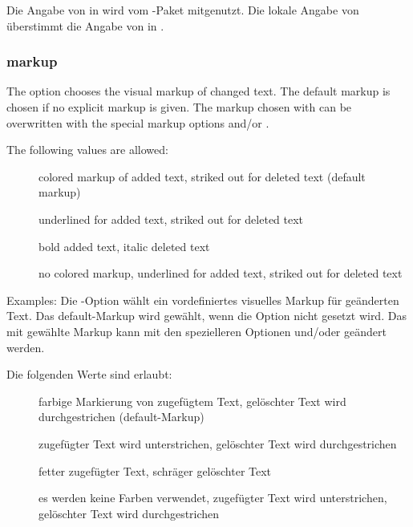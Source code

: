 		Die Angabe von  in  wird vom -Paket mitgenutzt.
		Die lokale Angabe von  überstimmt die Angabe von  in .
	\fi


\subsubsection{markup}
\ifENGLISH
	The  option chooses the visual markup of changed text.
	The default markup is chosen if no explicit markup is given.
	The markup chosen with  can be overwritten with the special markup options  and/or .

	The following values are allowed:
	\begin{description}
		\item [] colored markup of added text, striked out for deleted text (default markup)
		\item [] underlined for added text, striked out for deleted text
		\item [] bold added text, italic deleted text
		\item [] no colored markup, underlined for added text, striked out for deleted text
	\end{description}

	Examples:
\fi
	\ifGERMAN
		Die -Option wählt ein vordefiniertes visuelles Markup für geänderten Text.
		Das default-Markup wird gewählt, wenn die Option nicht gesetzt wird.
		Das mit  gewählte Markup kann mit den spezielleren Optionen  und/oder  geändert werden.

		Die folgenden Werte sind erlaubt:
		\begin{description}
			\item [] farbige Markierung von zugefügtem Text, gelöschter Text wird durchgestrichen (default-Markup)
			\item [] zugefügter Text wird unterstrichen, gelöschter Text wird durchgestrichen
			\item [] fetter zugefügter Text, schräger gelöschter Text
			\item [] es werden keine Farben verwendet, zugefügter Text wird unterstrichen, gelöschter Text wird durchgestrichen
		\end{description}

